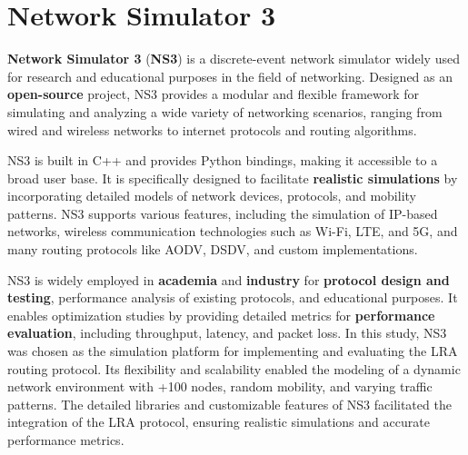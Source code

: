 \documentclass[../report.tex]{subfiles}
\begin{document}
\section{Network Simulator 3}
\textbf{Network Simulator 3} (\textbf{NS3}\cite{ns3}) is a discrete-event network simulator widely used for research and educational purposes in the field of networking. Designed as an \textbf{open-source} project, NS3 provides a modular and flexible framework for simulating and analyzing a wide variety of networking scenarios, ranging from wired and wireless networks to internet protocols and routing algorithms.

NS3 is built in C++ and provides Python bindings, making it accessible to a broad user base. It is specifically designed to facilitate \textbf{realistic simulations} by incorporating detailed models of network devices, protocols, and mobility patterns. NS3 supports various features, including the simulation of IP-based networks, wireless communication technologies such as Wi-Fi, LTE, and 5G, and many routing protocols like AODV, DSDV, and custom implementations.

NS3 is widely employed in \textbf{academia} and \textbf{industry} for \textbf{protocol design and testing}, performance analysis of existing protocols, and educational purposes. It enables optimization studies by providing detailed metrics for \textbf{performance evaluation}, including throughput, latency, and packet loss. In this study, NS3 was chosen as the simulation platform for implementing and evaluating the LRA routing protocol. Its flexibility and scalability enabled the modeling of a dynamic network environment with +100 nodes, random mobility, and varying traffic patterns. The detailed libraries and customizable features of NS3 facilitated the integration of the LRA protocol, ensuring realistic simulations and accurate performance metrics.
\end{document}

